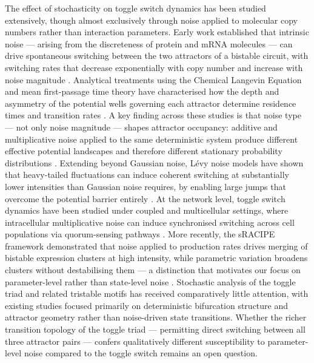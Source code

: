 \documentclass[11pt]{article}
\begin{document}
The effect of stochasticity on toggle switch dynamics has been studied extensively, though almost exclusively through noise applied to molecular copy numbers rather than interaction parameters. Early work established that intrinsic noise — arising from the discreteness of protein and mRNA molecules — can drive spontaneous switching between the two attractors of a bistable circuit, with switching rates that decrease exponentially with copy number and increase with noise magnitude \cite{tian2006stochastic, Wang2007Noise-inducedSwitch}. Analytical treatments using the Chemical Langevin Equation and mean first-passage time theory have characterised how the depth and asymmetry of the potential wells governing each attractor determine residence times and transition rates \cite{Wang2010TheDifferentiation, Strasser2012StabilityExpression, Xu2014SwitchSwitch}. A key finding across these studies is that noise type — not only noise magnitude — shapes attractor occupancy: additive and multiplicative noise applied to the same deterministic system produce different effective potential landscapes and therefore different stationary probability distributions \cite{Jaruszewicz2013ToggleGene}. Extending beyond Gaussian noise, Lévy noise models have shown that heavy-tailed fluctuations can induce coherent switching at substantially lower intensities than Gaussian noise requires, by enabling large jumps that overcome the potential barrier entirely \cite{Xu2016TheNoise}. At the network level, toggle switch dynamics have been studied under coupled and multicellular settings, where intracellular multiplicative noise can induce synchronised switching across cell populations via quorum-sensing pathways \cite{Wang2007Noise-inducedSwitch}. More recently, the sRACIPE framework demonstrated that noise applied to production rates drives merging of bistable expression clusters at high intensity, while parametric variation broadens clusters without destabilising them — a distinction that motivates our focus on parameter-level rather than state-level noise \cite{Kohar2018RoleCircuits}. Stochastic analysis of the toggle triad and related tristable motifs has received comparatively little attention, with existing studies focused primarily on deterministic bifurcation structure and attractor geometry \cite{doi:10.1098/rsif.2020.0631, Duddu2025DistinctNetworks} rather than noise-driven state transitions. Whether the richer transition topology of the toggle triad — permitting direct switching between all three attractor pairs — confers qualitatively different susceptibility to parameter-level noise compared to the toggle switch remains an open question.
\end{document}
